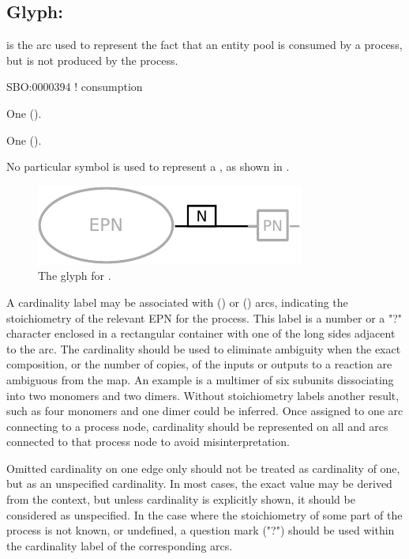 \subsection{Glyph: }
\label{sec:consumption}

 is the arc used to represent the fact that an entity pool is consumed by a process, but is not produced by the process.

\begin{glyphDescription}

\glyphSboTerm
SBO:0000394 ! consumption

\glyphOrigin
One  ().

\glyphTarget
One  ().

\glyphSymbol
No particular symbol is used to represent a , as shown in .

\end{glyphDescription}

\begin{figure}[H]
  \centering
  \includegraphics{images/build/consumption.pdf}
  \caption{The \PD glyph for .}
  \label{fig:consumption}
\end{figure}

A cardinality label may be associated with  () or  () arcs, indicating the stoichiometry of the relevant EPN for the process.
This label is a number or a "?" character enclosed in a rectangular container with one of the long sides adjacent to the  arc.
The cardinality should be used to eliminate ambiguity when the exact composition, or the number of copies, of the inputs or outputs to a reaction are ambiguous from the map.
An example is a multimer of six subunits dissociating into two monomers and two dimers.
Without stoichiometry labels another result, such as four monomers and one dimer could be inferred.
Once assigned to one arc connecting to a process node, cardinality should be represented on all  and  arcs connected to that process node to avoid misinterpretation.

Omitted cardinality on one edge only should not be treated as cardinality of one, but as an unspecified cardinality.
In most cases, the exact value may be derived from the context, but unless cardinality is explicitly shown, it should be considered as unspecified.
In the case where the stoichiometry of some part of the process is not known, or undefined, a question mark ("?") should be used within the cardinality label of the corresponding arcs.
